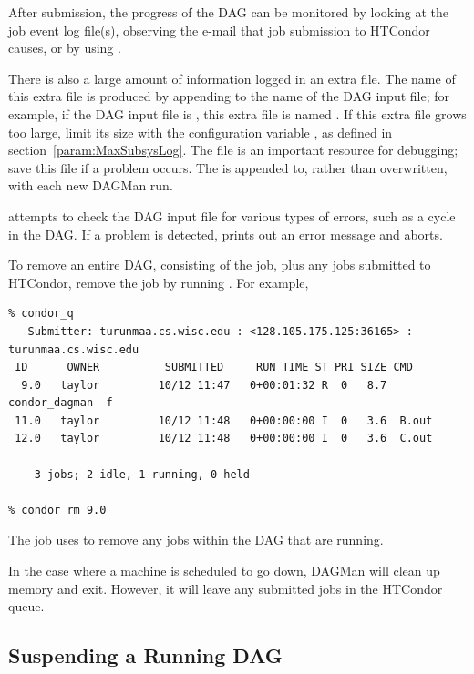 After submission, the progress of the DAG can be monitored
by looking at the job event log file(s),
observing the e-mail that job submission to HTCondor causes,
or by using  .

There is also a large amount of information logged in an extra file.
The name of this extra file is produced by appending
 to the name of the DAG input file; 
for example, if the DAG input file is , 
this extra file is named .
If this extra file grows too large, limit its size
with the configuration variable ,
as defined in section~\ref{param:MaxSubsysLog}.
The  file is an important resource for
debugging; save this file if a problem occurs. 
The  is appended to, rather than overwritten, 
with each new DAGMan run.

 attempts to check the DAG input file
for various types of errors,
such as a cycle in the DAG.
If a problem is detected,
 prints out an error message and aborts.

To remove an entire DAG, consisting of the  job, 
plus any jobs submitted to HTCondor,
remove the  job by running .
For example,
\footnotesize
\begin{verbatim}
% condor_q
-- Submitter: turunmaa.cs.wisc.edu : <128.105.175.125:36165> : turunmaa.cs.wisc.edu
 ID      OWNER          SUBMITTED     RUN_TIME ST PRI SIZE CMD
  9.0   taylor         10/12 11:47   0+00:01:32 R  0   8.7  condor_dagman -f -
 11.0   taylor         10/12 11:48   0+00:00:00 I  0   3.6  B.out
 12.0   taylor         10/12 11:48   0+00:00:00 I  0   3.6  C.out

    3 jobs; 2 idle, 1 running, 0 held

% condor_rm 9.0
\end{verbatim}
\normalsize

The  job uses 
to remove any jobs within the DAG that are running.

In the case where a
machine is scheduled to go down,
DAGMan will clean up memory and exit.
However, it will leave any submitted jobs
in the HTCondor queue.

\subsection{\label{sec:DagSuspend}Suspending a Running DAG}

